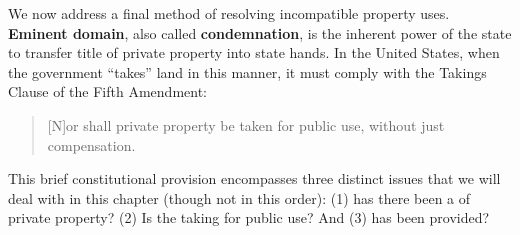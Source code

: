 We now address a final method of resolving incompatible property uses.
\textbf{Eminent domain}, also called \textbf{condemnation},
is the inherent power of the state to transfer title of
private property into state hands. In the United States, when the government
``takes'' land in this manner, it must comply with the Takings Clause of the
Fifth Amendment:
\begin{quote}
[N]or shall private property be taken for public use, without just compensation.
\end{quote}
This
brief constitutional provision encompasses three distinct issues that we will
deal with in this chapter (though not in this order): (1) has there been a
 of private property? (2) Is the taking for {public use}? And (3)
has  been provided?

